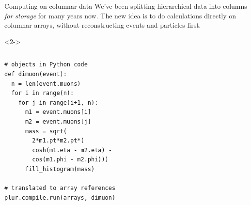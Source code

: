 \documentclass{beamer}
\begin{document}
\begin{frame}[fragile]{Computing on columnar data}
\vspace{0.5 cm}
We've been splitting hierarchical data into columns {\it for storage} for many years now. The new idea is to do calculations directly on columnar arrays, without reconstructing events and particles first.

\begin{uncoverenv}<2->
\vspace{0.35 cm}
\begin{columns}[b]
\scriptsize
\begin{verbatim}
# objects in Python code
def dimuon(event):
  n = len(event.muons)
  for i in range(n):
    for j in range(i+1, n):
      m1 = event.muons[i]
      m2 = event.muons[j]
      mass = sqrt(
        2*m1.pt*m2.pt*(
        cosh(m1.eta - m2.eta) -
        cos(m1.phi - m2.phi)))
      fill_histogram(mass)

# translated to array references
plur.compile.run(arrays, dimuon)
\end{verbatim}


\end{columns}
\end{uncoverenv}
\end{frame}
\end{document}
